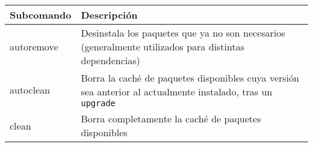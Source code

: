 \begin{longtable}[c]{@{}ll@{}}
\toprule
\begin{minipage}[b]{0.18\columnwidth}\raggedright\strut
Subcomando
\strut\end{minipage} &
\begin{minipage}[b]{0.51\columnwidth}\raggedright\strut
Descripción
\strut\end{minipage}\tabularnewline
\midrule
\endhead
\begin{minipage}[t]{0.18\columnwidth}\raggedright\strut
autoremove
\strut\end{minipage} &
\begin{minipage}[t]{0.51\columnwidth}\raggedright\strut
Desinstala los paquetes que ya no son necesarios (generalmente
utilizados para distintas dependencias)
\strut\end{minipage}\tabularnewline
\begin{minipage}[t]{0.18\columnwidth}\raggedright\strut
autoclean
\strut\end{minipage} &
\begin{minipage}[t]{0.51\columnwidth}\raggedright\strut
Borra la caché de paquetes disponibles cuya versión sea anterior al
actualmente instalado, tras un \texttt{upgrade}
\strut\end{minipage}\tabularnewline
\begin{minipage}[t]{0.18\columnwidth}\raggedright\strut
clean
\strut\end{minipage} &
\begin{minipage}[t]{0.51\columnwidth}\raggedright\strut
Borra completamente la caché de paquetes disponibles
\strut\end{minipage}\tabularnewline
\bottomrule
\end{longtable}
